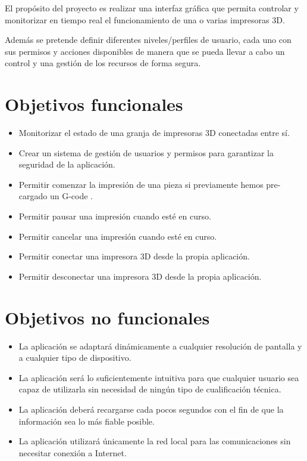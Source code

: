 
El propósito del proyecto es realizar una interfaz gráfica que permita controlar y monitorizar en tiempo real el funcionamiento de una o varias impresoras 3D.

Además se pretende definir diferentes niveles/perfiles de usuario, cada uno con sus permisos y acciones disponibles de manera que se pueda llevar a cabo un control y una gestión de los recursos de forma segura.

\section{Objetivos funcionales}
\begin{itemize}
\tightlist
\item Monitorizar el estado de una granja de impresoras 3D conectadas entre sí.
\item
    Crear un sistema de gestión de usuarios y permisos para garantizar la seguridad de la aplicación.
\item
    Permitir comenzar la impresión de una pieza si previamente hemos pre-cargado un G-code \cite{wiki:gcode}.
\item
    Permitir pausar una impresión cuando esté en curso.
\item
    Permitir cancelar una impresión cuando esté en curso.
\item
    Permitir conectar una impresora 3D desde la propia aplicación.
\item
    Permitir desconectar una impresora 3D desde la propia aplicación.

    
\end{itemize}

\clearpage

\section{Objetivos no funcionales}
\begin{itemize}
\tightlist
\item
    La aplicación se adaptará dinámicamente a cualquier resolución de pantalla y a cualquier tipo de dispositivo.
\item
	La aplicación será lo suficientemente intuitiva para que cualquier usuario sea capaz de utilizarla sin necesidad de ningún tipo de cualificación técnica.
\item
    La aplicación deberá recargarse cada pocos segundos con el fin de que la información sea lo más fiable posible.
\item
	La aplicación utilizará únicamente la red local para las comunicaciones sin necesitar conexión a Internet.

\end{itemize}